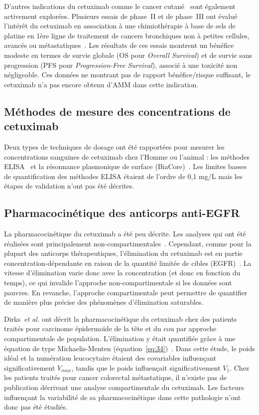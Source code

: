 D'autres indications du cetuximab comme le cancer cutané~\citep{REF119} sont également activement explorées. Plusieurs essais de phase~II et de phase~III ont évalué l'intérêt du cetuximab en association à une chimiothérapie à base de sels de platine en 1ère ligne de traitement de cancers bronchiques non à petites cellules, avancés ou métastatiques~\citep{REF120, REF121}. Les résultats de ces essais montrent un bénéfice modeste en termes de survie globale (OS pour \textit{Overall Survival}) et de survie sans progression (PFS pour \textit{Progression-Free Survival}), associé à une toxicité non négligeable. Ces données ne montrant pas de rapport bénéfice/risque suffisant, le cetuximab n'a pas encore obtenu d'AMM dans cette indication.

\subsection{Méthodes de mesure des concentrations de cetuximab}
Deux types de techniques de dosage ont été rapportées pour mesurer les concentrations sanguines de cetuximab chez l'Homme ou l'animal : les méthodes ELISA~\citep{REF122, REF123, REF124} et la résonnance plasmonique de surface (BiaCore)~\citep{REF125}. Les limites basses de quantification des méthodes ELISA étaient de l'ordre de 0,1 mg/L mais les étapes de validation n'ont pas été décrites.

\subsection{Pharmacocinétique des anticorps anti-EGFR}
La pharmacocinétique du cetuximab a été peu décrite. Les analyses qui ont été réalisées sont principalement non-compartimentales~\citep{REF118, REF122, REF126}. Cependant, comme pour la plupart des anticorps thérapeutiques, l'élimination du cetuximab est en partie concentration-dépendante en raison de la quantité limitée de cibles (EGFR)~\citep{REF123, REF127, REF128}. La vitesse d'élimination varie donc avec la concentration (et donc en fonction du temps), ce qui invalide l'approche non-compartimentale si les données sont pauvres. En revanche, l'approche compartimentale peut permettre de quantifier de manière plus précise des phénomènes d'élimination saturables.

Dirks~\textit{et al.} ont décrit la pharmacocinétique du cetuximab chez des patients traités pour carcinome épidermoïde de la tête et du cou par approche compartimentale de population. L'élimination y était quantifiée grâce à une équation de type Michaelis-Menten (équation~\ref{eq:34})~\citep{REF68}. Dans cette étude, le poids idéal et la numération leucocytaire étaient des covariables influençant significativement $V_{max}$, tandis que le poids influençait significativement $V_1$. Chez les patients traités pour cancer colorectal métastatique, il n'existe pas de publication décrivant une analyse compartimentale du cetuximab. Les facteurs influençant la variabilité de sa pharmacocinétique dans cette pathologie n'ont donc pas été étudiés.

